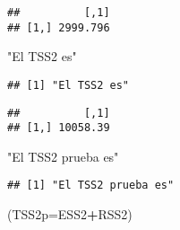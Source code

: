 \documentclass[
]{article}
\newenvironment{Shaded}{\begin{snugshade}}{\end{snugshade}}
\newcommand{\DataTypeTok}[1]{\textcolor[rgb]{0.13,0.29,0.53}{#1}}
\newcommand{\DecValTok}[1]{\textcolor[rgb]{0.00,0.00,0.81}{#1}}
\newcommand{\KeywordTok}[1]{\textcolor[rgb]{0.13,0.29,0.53}{\textbf{#1}}}
\newcommand{\NormalTok}[1]{#1}
\newcommand{\OperatorTok}[1]{\textcolor[rgb]{0.81,0.36,0.00}{\textbf{#1}}}
\newcommand{\StringTok}[1]{\textcolor[rgb]{0.31,0.60,0.02}{#1}}
\begin{document}
\begin{Shaded}
\end{Shaded}

\begin{verbatim}
##          [,1]
## [1,] 2999.796
\end{verbatim}

\begin{Shaded}
\begin{Highlighting}[]
\StringTok{"El TSS2 es"}
\end{Highlighting}
\end{Shaded}

\begin{verbatim}
## [1] "El TSS2 es"
\end{verbatim}

\begin{Shaded}
\end{Shaded}

\begin{verbatim}
##          [,1]
## [1,] 10058.39
\end{verbatim}

\begin{Shaded}
\begin{Highlighting}[]
\StringTok{"El TSS2 prueba es"}
\end{Highlighting}
\end{Shaded}

\begin{verbatim}
## [1] "El TSS2 prueba es"
\end{verbatim}

\begin{Shaded}
\begin{Highlighting}[]
\NormalTok{(}\DataTypeTok{TSS2p=}\NormalTok{ESS2}\OperatorTok{+}\NormalTok{RSS2)}
\end{Highlighting}
\end{Shaded}
\end{document}
